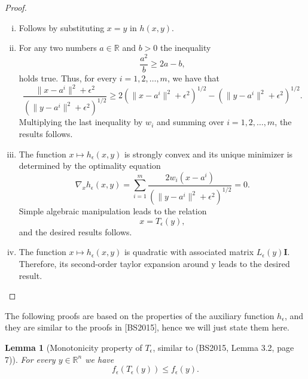 \documentclass[11pt]{article}
\numberwithin{equation}{section}
\newtheorem{lemma}{Lemma}[proposition]
\begin{document}
\begin{proof}
\begin{enumerate}[(i)]
	\item Follows by substituting $x=y$ in $h(x,y)$.
	\item For any two numbers $a \in \mathbb{R}$ and $b>0$ the inequality 
	\begin{equation*}
		\frac{a^2}{b} \geq 2a - b ,
	\end{equation*}
	holds true. Thus, for every $i=1,2, \ldots ,m$, we have that
	\begin{equation*}
		\frac{\|x-a^i\|^2 + {\epsilon}^2}{\left( \|y-a^i\|^2 + {\epsilon}^2 \right)^{1/2}} \geq 2\left( \|x-a^i\|^2 + {\epsilon}^2 \right)^{1/2} - \left( \|y-a^i\|^2 + {\epsilon}^2 \right)^{1/2} .
	\end{equation*}
	Multiplying the last inequality by $w_i$ and summing over $i=1,2, \ldots, m$, the results follows. 
	\item The function $x \mapsto h_{\epsilon}(x,y)$ is strongly convex and its unique minimizer is determined by the optimality equation
	\begin{equation*}
		\nabla_x h_{\epsilon}(x,y) = \sum\limits_{i=1}^m \frac{2w_i \left( x-a^i \right) }{\left( \|y-a^i\|^2 + {\epsilon}^2 \right)^{1/2}} = 0 .
	\end{equation*}
	Simple algebraic manipulation leads to the relation
	\begin{equation*}
		x = T_{\epsilon}(y) ,
	\end{equation*}
	and the desired results follows.
	\item The function $x \mapsto h_{\epsilon}(x,y)$ is quadratic with associated matrix $L_{\epsilon}(y)\textbf{I}$. Therefore, its second-order taylor expansion around y leads to the desired result.
\end{enumerate}
\end{proof}

The following proofs are based on the properties of the auxiliary function $h_{\epsilon}$, and they are similar to the proofs in [BS2015], hence we will just state them here.

\begin{lemma}[Monotonicity property of $T_{\epsilon}$, similar to  (BS2015, Lemma 3.2, page 7)] For every $y \in \mathbb{R}^n$ we have
\begin{equation*}
	f_{\epsilon}(T_{\epsilon}(y)) \leq f_{\epsilon}(y).
\end{equation*}
\end{lemma}
\end{document}
